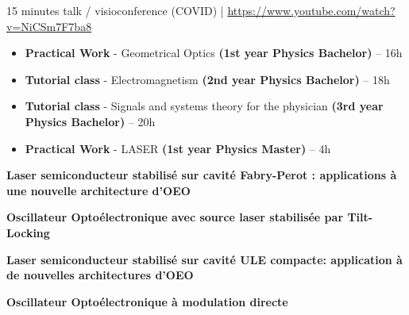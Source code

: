 \documentclass[9pt,a4paper,academicons]{altacv}
\begin{document}
\begin{fullwidth}
  \newpage



  {}

  \smallskip

  {15 minutes talk / visioconference (COVID)} | {\color{red}\faYoutubePlay}  \href{https://www.youtube.com/watch?v=NiCSm7F7ba8}{https://www.youtube.com/watch?v=NiCSm7F7ba8}






  \medskip


  \begin{itemize}
    \item \textbf{Practical Work} - Geometrical Optics \textbf{(1st year Physics Bachelor)} -- 16h
    \item \textbf{Tutorial class} - Electromagnetism \textbf{(2nd year Physics Bachelor)} -- 18h
    \item \textbf{Tutorial class} - Signals and systems theory for the physician \textbf{(3rd year Physics Bachelor)} -- 20h
    \item \textbf{Practical Work} - LASER \textbf{(1st year Physics Master)} -- 4h
  \end{itemize}

  \medskip

  \vspace{-0.5em}\textbf{Laser semiconducteur stabilisé sur cavité Fabry-Perot : applications à une
    nouvelle architecture d'OEO}

  \divider


  \vspace{-0.5em}\textbf{Oscillateur Optoélectronique avec source laser stabilisée par Tilt-Locking}

  \divider

  \vspace{-0.5em}\textbf{Laser semiconducteur stabilisé sur
    cavité ULE compacte: application à
    de nouvelles architectures d’OEO}

  \divider


  \vspace{-0.5em}\textbf{Oscillateur Optoélectronique à modulation directe}




\end{fullwidth}
\end{document}
